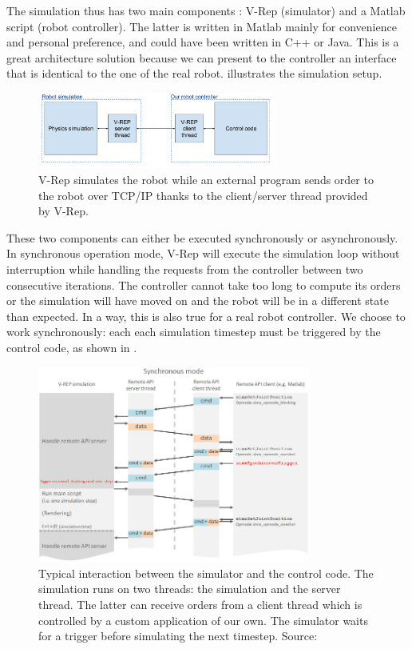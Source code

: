 The simulation thus has two main components : V-Rep (simulator) and a Matlab script (robot controller). The latter is written in Matlab mainly for convenience and personal preference, and could have been written in C++ or Java. This is a great architecture solution because we can present to the controller an interface that is identical to the one of the real robot.  illustrates the simulation setup.

\begin{figure}[htp]
\centering
\includegraphics[width=0.7\textwidth]{figures/simulation_principles}
\caption[Simulation principles]{V-Rep simulates the robot while an external program sends order to the robot over TCP/IP thanks to the client/server thread provided by V-Rep.}
\label{fig:simulation_principles}
\end{figure}

These two components can either be executed synchronously or asynchronously. In synchronous operation mode, V-Rep will execute the simulation loop without interruption while handling the requests from the controller between two consecutive iterations. The controller cannot take too long to compute its orders or the simulation will have moved on and the robot will be in a different state than expected. In a way, this is also true for a real robot controller. We choose to work synchronously: each each simulation timestep must be triggered by the control code, as shown in .

\begin{figure}[htp]
\centering
\includegraphics[width=0.8\textwidth]{figures/remoteApiSynchronous}
\caption[Simulation interaction]{Typical interaction between the simulator and the control code. The simulation runs on two threads: the simulation and the server thread. The latter can receive orders from a client thread which is controlled by a custom application of our own. The simulator waits for a trigger before simulating the next timestep. Source: \cite{vrep_manual}}
\label{fig:remoteApi}
\end{figure}

